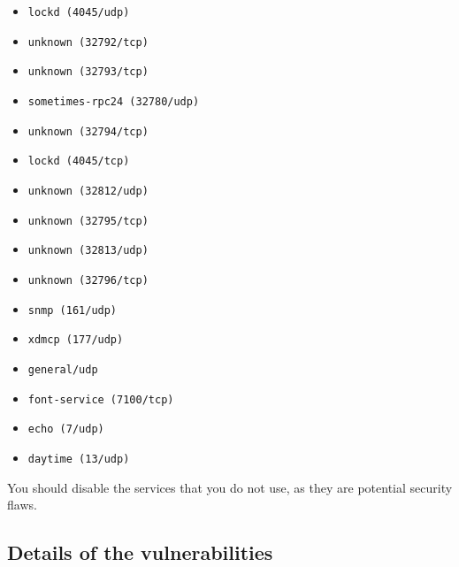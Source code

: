 \documentclass{article}
\begin{document}
\begin{itemize}
\item\verb+lockd (4045/udp)+
\item\verb+unknown (32792/tcp)+
\item\verb+unknown (32793/tcp)+
\item\verb+sometimes-rpc24 (32780/udp)+
\item\verb+unknown (32794/tcp)+
\item\verb+lockd (4045/tcp)+
\item\verb+unknown (32812/udp)+
\item\verb+unknown (32795/tcp)+
\item\verb+unknown (32813/udp)+
\item\verb+unknown (32796/tcp)+
\item\verb+snmp (161/udp)+
\item\verb+xdmcp (177/udp)+
\item\verb+general/udp+
\item\verb+font-service (7100/tcp)+
\item\verb+echo (7/udp)+
\item\verb+daytime (13/udp)+
\end{itemize}
You should disable the services that you do not use, as they are potential security flaws.
\subsection{Details of the vulnerabilities}
\end{document}
